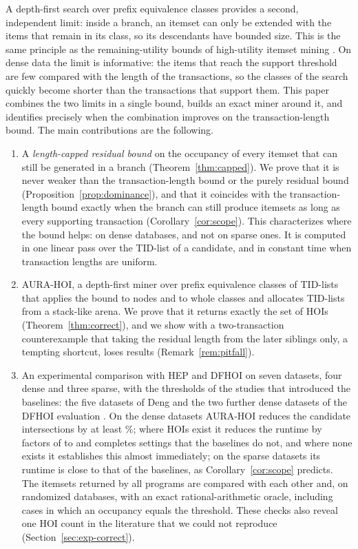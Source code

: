 \documentclass[pdflatex,sn-mathphys,Numbered]{sn-jnl}
\theoremstyle{thmstyleone}
\theoremstyle{thmstyletwo}
\theoremstyle{thmstylethree}
\newcommand{\AURA}{AURA-HOI}
\begin{document}
A depth-first search over prefix equivalence classes provides a second, independent limit: inside a branch, an itemset can only be extended with the items that remain in its class, so its descendants have bounded size. This is the same principle as the remaining-utility bounds of high-utility itemset mining \cite{liu2012huiminer,zida2017efim}. On dense data the limit is informative: the items that reach the support threshold are few compared with the length of the transactions, so the classes of the search quickly become shorter than the transactions that support them. This paper combines the two limits in a single bound, builds an exact miner around it, and identifies precisely when the combination improves on the transaction-length bound. The main contributions are the following.
\begin{enumerate}
\item A \emph{length-capped residual bound} on the occupancy of every itemset that can still be generated in a branch (Theorem~\ref{thm:capped}). We prove that it is never weaker than the transaction-length bound or the purely residual bound (Proposition~\ref{prop:dominance}), and that it coincides with the transaction-length bound exactly when the branch can still produce itemsets as long as every supporting transaction (Corollary~\ref{cor:scope}). This characterizes where the bound helps: on dense databases, and not on sparse ones. It is computed in one linear pass over the TID-list of a candidate, and in constant time when transaction lengths are uniform.
\item \AURA{}, a depth-first miner over prefix equivalence classes of TID-lists that applies the bound to nodes and to whole classes and allocates TID-lists from a stack-like arena. We prove that it returns exactly the set of HOIs (Theorem~\ref{thm:correct}), and we show with a two-transaction counterexample that taking the residual length from the later siblings only, a tempting shortcut, loses results (Remark~\ref{rem:pitfall}).
\item An experimental comparison with HEP and DFHOI on seven datasets, four dense and three sparse, with the thresholds of the studies that introduced the baselines: the five datasets of Deng \cite{deng2020hoi} and the two further dense datasets of the DFHOI evaluation \cite{nguyen2023dfhoi}. On the dense datasets \AURA{} reduces the candidate intersections by at least \NodeReductionMinDense{}\%; where HOIs exist it reduces the runtime by factors of \MinSpeedupDenseNonEmpty{} to \MaxSpeedupDenseNonEmpty{} and completes settings that the baselines do not, and where none exists it establishes this almost immediately; on the sparse datasets its runtime is close to that of the baselines, as Corollary~\ref{cor:scope} predicts. The itemsets returned by all programs are compared with each other and, on randomized databases, with an exact rational-arithmetic oracle, including cases in which an occupancy equals the threshold. These checks also reveal one HOI count in the literature that we could not reproduce (Section~\ref{sec:exp-correct}).
\end{enumerate}
\end{document}

